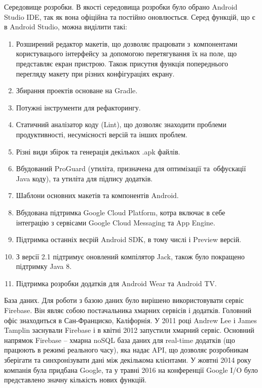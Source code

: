 \documentclass[../main.tex]{subfiles}
\begin{document}
Середовище розробки.
В якості середовища розробки було обрано Android Studio IDE, так як вона офіційна та постійно оновлюється. Серед функцій, що є в Android Studio, можна виділити такі:

\begin{enumerate}
	\item Розширений редактор макетів, що дозволяє працювати з~компонентами користувацього інтерфейсу за допомогою перетягування їх на поле, що представляє екран пристрою. Також присутня функція попереднього перегляду макету при різних конфігураціях екрану.
	\item Збирання проектів основане на Gradle.
	\item Потужні інструменти для рефакторингу.
	\item Статичний аналізатор коду (Lint), що дозволяє знаходити проблеми продуктивності, несумісності версій та інших проблем.
	\item Різні види збірок та генерація декількох .apk файлів.
	\item Вбудований ProGuard (утиліта, призначена для оптимізації та~обфускації Java коду), та утиліта для підпису додатків.
	\item Шаблони основних макетів та компонентів Android.
	\item Вбудована підтримка Google Cloud Platform, котра включає в себе інтеграцію з сервісами Google Cloud Messaging та App Engine.
	\item Підтримка останніх весрій Android SDK, в тому числі і Preview версій.
	\item З версії 2.1 підтримує оновлений компілятор Jack, також було покращено підтримку Java 8.
	\item Підтримка розробки додатків для Android Wear та Android TV.
\end{enumerate}


База даних.
Для роботи з базою даних було вирішено використовувати сервіс Firebase. Він являє собою постачальника хмарних сервісів і додатків. Головний офіс знаходиться в Сан-Франциско, Каліфорнія. У 2011 році Andrew Lee і James Tamplin заснували Firebase і в квітні 2012 запустили хмарний сервіс. Основний напрямок Firebase -- хмарна noSQL база даних для real-time додатків (що працюють в режимі реального часу), яка надає API, що дозволяє розробникам зберігати та синхронізувати дані між декількома клієнтами. У жовтні 2014 року компанія була придбана Google, та у травні 2016 на конференції Google I/O було представлено значну кількість нових функцій.
\end{document}
